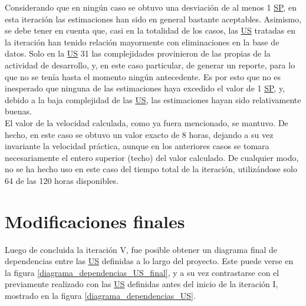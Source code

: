 \documentclass[a4paper, 12pt,twoside]{report}  %
\numberwithin{equation}{subsection} %
\begin{document}
\indent Considerando que en ningún caso se obtuvo una desviación de al menos 1 \hyperlink{SP}{SP}, en esta iteración las estimaciones han sido en general bastante aceptables. Asimismo, se debe tener en cuenta que, casi en la totalidad de los casos, las \hyperlink{US}{US} tratadas en la iteración han tenido relación mayormente con eliminaciones en la base de datos. Solo en la \hyperlink{US}{US} 31 las complejidades provinieron de las propias de la actividad de desarrollo, y, en este caso particular, de generar un reporte, para lo que no se tenía hasta el momento ningún antecedente. Es por esto que no es inesperado que ninguna de las estimaciones haya excedido el valor de 1 \hyperlink{SP}{SP}, y, debido a la baja complejidad de las \hyperlink{US}{US}, las estimaciones hayan sido relativamente buenas.\\
\indent El valor de la velocidad calculada, como ya fuera mencionado, se mantuvo. De hecho, en este caso se obtuvo un valor exacto de 8 horas, dejando a su vez invariante la velocidad práctica, aunque en los anteriores casos se tomara necesariamente el entero superior (techo) del valor calculado. De cualquier modo, no se ha hecho uso en este caso del tiempo total de la iteración, utilizándose solo 64 de las 120 horas disponibles.

\section{Modificaciones finales}
Luego de concluida la iteración V, fue posible obtener un diagrama final de dependencias entre las \hyperlink{US}{US} definidas a lo largo del proyecto. Este puede verse en la figura \ref{diagrama_dependencias_US_final}, y a su vez contrastarse con el previamente realizado con las \hyperlink{US}{US} definidas antes del inicio de la iteración I, mostrado en la figura \ref{diagrama_dependencias_US}.
\end{document}
